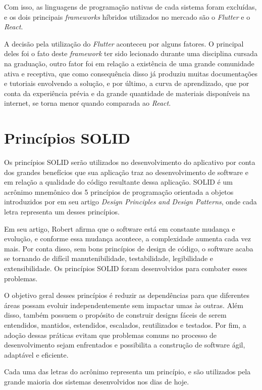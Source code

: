 Com isso, as linguagens de programação nativas de cada sistema foram excluídas, e os dois principais \textit{frameworks} híbridos utilizados no mercado são o \textit{Flutter} e o \textit{React}.

A decisão pela utilização do \textit{Flutter} aconteceu por alguns fatores. O principal deles foi o fato deste \textit{framework} ter sido lecionado durante uma disciplina cursada na graduação, outro fator foi em relação a existência de uma grande comunidade ativa e receptiva, que como consequência disso já produziu muitas documentações e tutoriais envolvendo a solução, e por último, a curva de aprendizado, que por conta da experiência prévia e da grande quantidade de materiais disponíveis na internet, se torna menor quando comparada ao \textit{React}.

\section{Princípios SOLID}\label{sec:solid}
Os princípios SOLID serão utilizados no desenvolvimento do aplicativo por conta dos grandes benefícios que sua aplicação traz ao desenvolvimento de software e em relação a qualidade do código resultante dessa aplicação. SOLID é um acrônimo mnemônico dos 5 princípios de programação orientada a objetos introduzidos por \textcite{unclebob} em seu artigo \textit{Design Principles and Design Patterns}, onde cada letra representa um desses princípios.

Em seu artigo, Robert afirma que o software está em constante mudança e evolução, e conforme essa mudança acontece, a complexidade aumenta cada vez mais. Por conta disso, sem bons princípios de design de código, o software acaba se tornando de difícil manutenibilidade, testabilidade, legibilidade e extensibilidade. Os princípios SOLID foram desenvolvidos para combater esses problemas.

O objetivo geral desses princípios é reduzir as dependências para que diferentes áreas possam evoluir independentemente sem impactar umas às outras. Além disso, também possuem o propósito de construir designs fáceis de serem entendidos, mantidos, estendidos, escalados, reutilizados e testados. Por fim, a adoção dessas práticas evitam que problemas comuns no processo de desenvolvimento sejam enfrentados e possibilita a construção de software ágil, adaptável e eficiente.

Cada uma das letras do acrônimo representa um princípio, e são utilizados pela grande maioria dos sistemas desenvolvidos nos dias de hoje.

